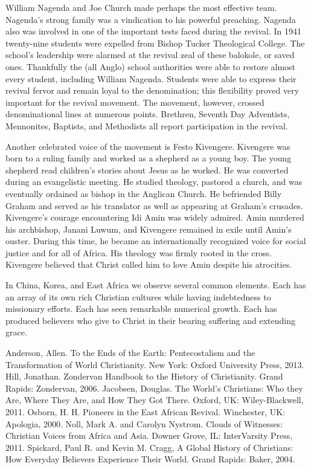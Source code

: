 William Nagenda and Joe Church made perhaps the most effective team. Nagenda’s strong family was a
vindication to his powerful preaching. Nagenda also was involved in one of the important tests faced
during the revival. In 1941 twenty-nine students were expelled from Bishop Tucker Theological
College. The school’s leadership were alarmed at the revival zeal of these balokole, or saved ones.
Thankfully the (all Anglo) school authorities were able to restore almost every student, including
William Nagenda. Students were able to express their revival fervor and remain loyal to the
denomination; this flexibility proved very important for the revival movement. The movement,
however, crossed denominational lines at numerous points. Brethren, Seventh Day Adventists,
Mennonites, Baptists, and Methodists all report participation in the revival.

Another celebrated voice of the movement is Festo Kivengere. Kivengere was born to a ruling family
and worked as a shepherd as a young boy. The young shepherd read children’s stories about Jesus as
he worked. He was converted during an evangelistic meeting. He studied theology, pastored a church,
and was eventually ordained as bishop in the Anglican Church. He befriended Billy Graham and served
as his translator as well as appearing at Graham’s crusades. Kivengere’s courage encountering Idi
Amin was widely admired. Amin murdered his archbishop, Janani Luwum, and Kivengere remained in exile
until Amin’s ouster. During this time, he became an internationally recognized voice for social
justice and for all of Africa. His theology was firmly rooted in the cross. Kivengere believed that
Christ called him to love Amin despite his atrocities.

In China, Korea, and East Africa we observe several common elements. Each has an array of its own
rich Christian cultures while having indebtedness to missionary efforts. Each has seen remarkable
numerical growth. Each has produced believers who give to Christ in their bearing suffering and
extending grace.

\begin{readinglist}
\entry *Anderson, Allen. To the Ends of the Earth: Pentecostalism and the Transformation of World
  Christianity. New York: Oxford University Press, 2013.
\entry *Hill, Jonathan. Zondervan Handbook to the History of Christianity. Grand Rapids: Zondervan,
  2006.
\entry *Jacobsen, Douglas. The World’s Christians: Who they Are, Where They Are, and How They Got
  There. Oxford, UK: Wiley-Blackwell, 2011.
\entry *Osborn, H. H. Pioneers in the East African Revival. Winchester, UK: Apologia, 2000.
\entry *Noll, Mark A. and Carolyn Nystrom. Clouds of Witnesses: Christian Voices from Africa and
  Asia. Downer Grove, IL: InterVarsity Press, 2011.
\entry *Spickard, Paul R. and Kevin M. Cragg, A Global History of Christians: How Everyday Believers
  Experience Their World. Grand Rapids: Baker, 2004.
\end{readinglist}
